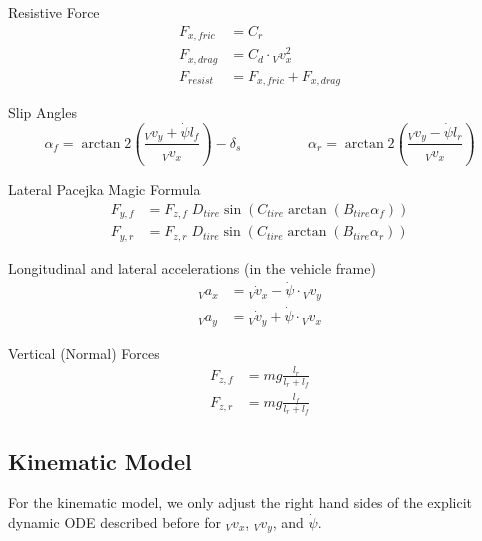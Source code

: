 \documentclass[
a4paper, %
10pt, %
notitlepage,
english]{CSUniSchoolLabReport}
\begin{document}
Resistive Force
\begin{align}
	F_{x, fric} &= C_r \\
	F_{x, drag} &= C_{d} \cdot {}_V v^2_x \\
	F_{resist} &= F_{x, fric} + F_{x, drag}
\end{align}

Slip Angles
\begin{equation}
	\alpha_f = \arctan2\left(\frac{{}_Vv_y + \dot{\psi} l_f}{{}_Vv_x}\right) - \delta_s
	\hspace{2cm}
	\alpha_r = \arctan2\left(\frac{{}_Vv_y - \dot{\psi} l_r}{{}_Vv_x}\right)
\end{equation}

Lateral Pacejka Magic Formula
\begin{align}
	F_{y, f} &= F_{z, f} \; D_{tire} \sin\left(C_{tire} \arctan(B_{tire}\alpha_f)\right) \\
	F_{y, r} &= F_{z, r} \; D_{tire} \sin\left(C_{tire} \arctan(B_{tire}\alpha_r)\right)
\end{align}

Longitudinal and lateral accelerations (in the vehicle frame)
\begin{align}
	{}_V a_x &= {}_V\dot{v}_x - \dot{\psi} \cdot {}_V v_y \\
	{}_V a_y &= {}_V\dot{v}_y + \dot{\psi} \cdot {}_V v_x
\end{align}

Vertical (Normal) Forces
\begin{align}
	F_{z, f} &= m g \frac{l_r}{l_r+l_f}\\
	F_{z, r} &= m g \frac{l_f}{l_r+l_f}
\end{align}

\subsection{Kinematic Model}

For the kinematic model, we only adjust the right hand sides of the explicit dynamic ODE described before for ${}_Vv_x$, ${}_Vv_y$, and $\dot{\psi}$.
\end{document}
